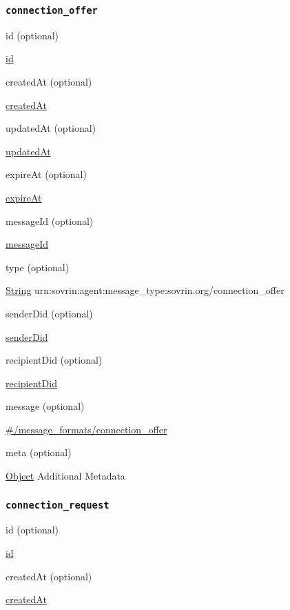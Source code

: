 \hypertarget{connection_offer}{%
\subsubsection{\texorpdfstring{\protect\hypertarget{connection_offer}{}{\texttt{connection\_offer}}}{connection\_offer}}\label{connection_offer}}

id (optional)

{\protect\hyperlink{id}{id}}

createdAt (optional)

{\protect\hyperlink{createdAt}{createdAt}}

updatedAt (optional)

{\protect\hyperlink{updatedAt}{updatedAt}}

expireAt (optional)

{\protect\hyperlink{expireAt}{expireAt}}

messageId (optional)

{\protect\hyperlink{messageId}{messageId}}

type (optional)

{\protect\hyperlink{string}{String}}
urn:sovrin:agent:message\_type:sovrin.org/connection\_offer

senderDid (optional)

{\protect\hyperlink{senderDid}{senderDid}}

recipientDid (optional)

{\protect\hyperlink{recipientDid}{recipientDid}}

message (optional)

{\protect\hyperlink{ux5cux23ux2fmessage_formatsux2fconnection_offer}{\#/message\_formats/connection\_offer}}

meta (optional)

{\protect\hyperlink{object}{Object}} Additional Metadata

\hypertarget{connection_request}{%
\subsubsection{\texorpdfstring{\protect\hypertarget{connection_request}{}{\texttt{connection\_request}}}{connection\_request}}\label{connection_request}}

id (optional)

{\protect\hyperlink{id}{id}}

createdAt (optional)

{\protect\hyperlink{createdAt}{createdAt}}

